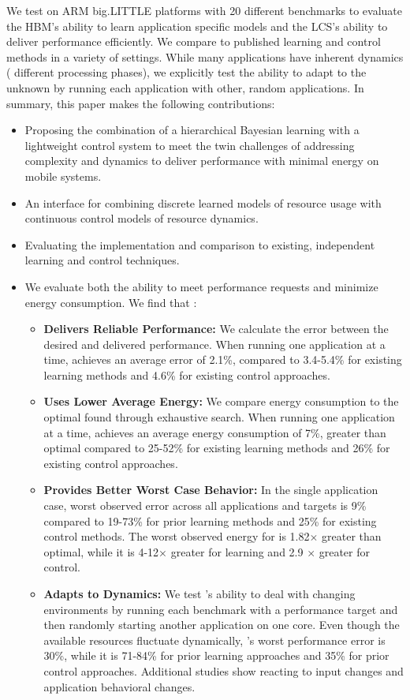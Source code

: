 We test \SYSTEM{} on ARM big.LITTLE platforms with 20 different
benchmarks to evaluate the HBM's ability to learn application specific
models and the LCS's ability to deliver performance efficiently.  We
compare to published learning and control methods in a variety of
settings.  While many applications have inherent dynamics (\ie
different processing phases), we explicitly test the ability to adapt
to the unknown by running each application with other, random
applications. In summary, this paper makes the following contributions:
\begin{itemize}
\item Proposing the combination of a hierarchical Bayesian learning
  with a lightweight control system to meet the twin challenges of
  addressing complexity and dynamics to deliver performance with
  minimal energy on mobile systems.
\item An interface for combining discrete learned models of resource
  usage with continuous control models of resource dynamics.
\item Evaluating the implementation and comparison to existing,
  independent learning and control techniques.

\item We evaluate both the ability to meet performance
requests and minimize energy consumption.  We find that \SYSTEM{}:
\begin{itemize}
\item \textbf{Delivers Reliable Performance: } We calculate the error
  between the desired and delivered performance.  When running one
  application at a time, \SYSTEM{} achieves an average error of 2.1\%,
  compared to 3.4-5.4\% for existing learning methods and 4.6\% for
  existing control approaches.
\item \textbf{Uses Lower Average Energy:} We compare energy
  consumption to the optimal found through exhaustive search.  When
  running one application at a time, \SYSTEM{} achieves an average
  energy consumption of 7\%, greater than optimal compared to 25-52\%
  for existing learning methods and 26\% for existing control
  approaches.
\item \textbf{Provides Better Worst Case Behavior:} In the single
  application case, \SYSTEM{} worst observed error across all
  applications and targets is 9\% compared to 19-73\% for prior
  learning methods and 25\% for existing control methods.  The worst
  observed energy for \SYSTEM{} is 1.82$\times$ greater than optimal,
  while it is 4-12$\times$ greater for learning and 2.9 $\times$
  greater for control.
\item \textbf{Adapts to Dynamics:} We test \SYSTEM{}'s ability to deal
  with changing environments by running each benchmark with a
  performance target and then randomly starting another application on
  one core.  Even though the available resources fluctuate
  dynamically, \SYSTEM{}'s worst performance error is 30\%, while it
  is 71-84\% for prior learning approaches and 35\% for prior control
  approaches.  Additional studies show \SYSTEM{} reacting to input
  changes and application behavioral changes.
\end{itemize}
\end{itemize}
